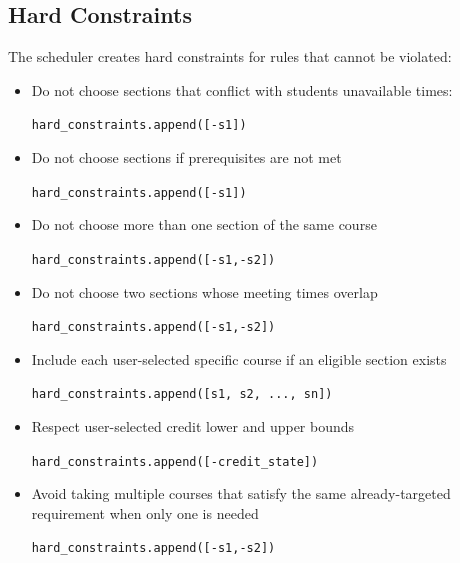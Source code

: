 \documentclass[11pt, a4paper]{article} %
\newcommand{\<}{\langle}
\renewcommand{\>}{\rangle}
\begin{document}
\subsection*{Hard Constraints}
The scheduler creates hard constraints for rules that cannot be violated:
\begin{itemize}
    \vspace{-2mm}
    \setlength{\itemsep}{-.2em}
    \item[$\bigstar$] Do not choose sections that conflict with students unavailable times: 
    \begin{algorithmic} 
    \State \texttt{hard\_constraints.append([-s1])}
    \EndIf
    \end{algorithmic}
    \item[$\bigstar$] Do not choose sections if prerequisites are not met
    \begin{algorithmic}
        \State \texttt{hard\_constraints.append([-s1])}
        \EndIf
    \end{algorithmic}
    \item[$\bigstar$] Do not choose more than one section of the same course
    \begin{algorithmic}
        \State \texttt{hard\_constraints.append([-s1,-s2])}
        \EndIf
    \end{algorithmic}
    \item[$\bigstar$] Do not choose two sections whose meeting times overlap
    \begin{algorithmic}
        \State \texttt{hard\_constraints.append([-s1,-s2])}
        \EndIf
    \end{algorithmic}
    \item[$\bigstar$] Include each user-selected specific course if an eligible section exists
  \begin{algorithmic}
          \State \texttt{hard\_constraints.append([s1, s2, ..., sn])}
      \EndIf
  \end{algorithmic}
    \item[$\bigstar$] Respect user-selected credit lower and upper bounds
 \begin{algorithmic}
          \State \texttt{hard\_constraints.append([-credit\_state])}
      \EndIf
  \end{algorithmic}
    \item[$\bigstar$] Avoid taking multiple courses that satisfy the same already-targeted requirement when only one is needed
    \begin{algorithmic}
        \State \texttt{hard\_constraints.append([-s1,-s2])}
        \EndIf
    \end{algorithmic}
\end{itemize}
\end{document}
